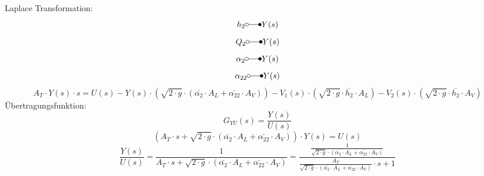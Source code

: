 Laplace Transformation: 
\[ h_2          \laplace Y(s) \]
\[ Q_2          \laplace Y(s) \]
\[ \alpha_2     \laplace Y(s) \]
\[ \alpha_{22}  \laplace Y(s) \]
\[ A_T \cdot Y(s) \cdot s = U(s) 
    - Y(s)   \cdot \left(\sqrt{2 \cdot g} \cdot (\bar{\alpha_2} \cdot A_L + \bar{\alpha_{22}} \cdot A_V)\right)
    - V_1(s) \cdot \left(\sqrt{2 \cdot g} \cdot \bar{h_2} \cdot A_L\right)
    - V_2(s) \cdot \left(\sqrt{2 \cdot g} \cdot \bar{h_2} \cdot A_V\right)
\]
Übertragungsfunktion: 
\[ G_{YU}(s) = \frac{Y(s)}{U(s)} \]
\[ \left(A_T \cdot s 
    + \sqrt{2 \cdot g} \cdot (\bar{\alpha_2} \cdot A_L + \bar{\alpha_{22}} \cdot A_V)\right) \cdot Y(s) = U(s) 
\]
\[ \frac{Y(s)}{U(s)} 
    = \frac{1}{A_T \cdot s + 
    \sqrt{2 \cdot g} \cdot (\bar{\alpha_2} \cdot A_L + \bar{\alpha_{22}} \cdot A_V)}
    = \frac{\frac{1}{\sqrt{2 \cdot g} \cdot (\bar{\alpha_2} \cdot A_L + \bar{\alpha_{22}} \cdot A_V)}}
    {\frac{A_T}{\sqrt{2 \cdot g} \cdot (\bar{\alpha_2} \cdot A_L + \bar{\alpha_{22}} \cdot A_V)} \cdot s + 1}
\]

